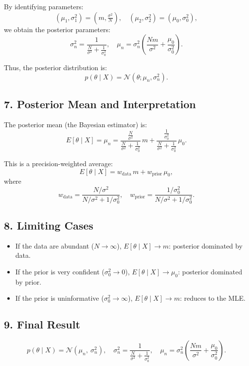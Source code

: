\documentclass[12pt,a4paper]{article}
\begin{document}
By identifying parameters:
\[
(\mu_1, \sigma_1^2) = (m, \tfrac{\sigma^2}{N}), 
\quad 
(\mu_2, \sigma_2^2) = (\mu_0, \sigma_0^2),
\]
we obtain the posterior parameters:
\[
\sigma_n^2 = \frac{1}{\frac{N}{\sigma^2} + \frac{1}{\sigma_0^2}},
\quad
\mu_n = \sigma_n^2\!\left(\frac{N m}{\sigma^2} + \frac{\mu_0}{\sigma_0^2}\right).
\]

Thus, the posterior distribution is:
\[
p(\theta \mid X) = \mathcal{N}(\theta; \mu_n, \sigma_n^2).
\]



\subsection*{7. Posterior Mean and Interpretation}

The posterior mean (the Bayesian estimator) is:
\[
E[\theta \mid X] = \mu_n
= 
\frac{\frac{N}{\sigma^2}}{\frac{N}{\sigma^2} + \frac{1}{\sigma_0^2}}\,m
+
\frac{\frac{1}{\sigma_0^2}}{\frac{N}{\sigma^2} + \frac{1}{\sigma_0^2}}\,\mu_0.
\]

\noindent
This is a precision-weighted average:
\[
E[\theta \mid X]
= w_{\text{data}}\, m + w_{\text{prior}}\, \mu_0,
\]
where
\[
w_{\text{data}} = \frac{N/\sigma^2}{N/\sigma^2 + 1/\sigma_0^2},
\quad
w_{\text{prior}} = \frac{1/\sigma_0^2}{N/\sigma^2 + 1/\sigma_0^2}.
\]



\subsection*{8. Limiting Cases}

\begin{itemize}
    \item If the data are abundant (\( N \to \infty \)), 
    \( E[\theta \mid X] \to m \): posterior dominated by data.
    \item If the prior is very confident (\( \sigma_0^2 \to 0 \)), 
    \( E[\theta \mid X] \to \mu_0 \): posterior dominated by prior.
    \item If the prior is uninformative (\( \sigma_0^2 \to \infty \)),
    \( E[\theta \mid X] \to m \): reduces to the MLE.
\end{itemize}



\subsection*{9. Final Result}

\[
\boxed{
p(\theta \mid X) = 
\mathcal{N}\!\left(
\mu_n,\ 
\sigma_n^2
\right),
\quad
\sigma_n^2 = \frac{1}{\tfrac{N}{\sigma^2} + \tfrac{1}{\sigma_0^2}},
\quad
\mu_n = \sigma_n^2\!\left(\frac{N m}{\sigma^2} + \frac{\mu_0}{\sigma_0^2}\right).
}
\]
\end{document}
